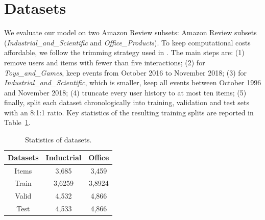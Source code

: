 \section{Datasets}

We evaluate our model on two Amazon Review subsets:  Amazon Review subsets (\textit{Industrial\_and\_Scientific} and \textit{Office\_Products}).  
To keep computational costs affordable, we follow the trimming strategy used in \citep{D3}.  
The main steps are:  
(1) remove users and items with fewer than five interactions;  
(2) for \textit{Toys\_and\_Games}, keep events from October 2016 to November 2018;  
(3) for \textit{Industrial\_and\_Scientific}, which is smaller, keep all events between October 1996 and November 2018;   
(4) truncate every user history to at most ten items;  
(5) finally, split each dataset chronologically into training, validation and test sets with an 8:1:1 ratio.  
Key statistics of the resulting training splits are reported in Table~\ref{tab:stats}.

\begin{table}[H]
\centering
\caption{Statistics of datasets.} 
\label{tab:stats}
\begin{tabular}{ccc}
\toprule
Datasets & Inductrial & Office \\ \midrule
Items    & 3,685      & 3,459  \\
Train    & 3,6259     & 3,8924 \\
Valid    & 4,532      & 4,866  \\
Test     & 4,533      & 4,866  \\ \bottomrule
\end{tabular}
\end{table}